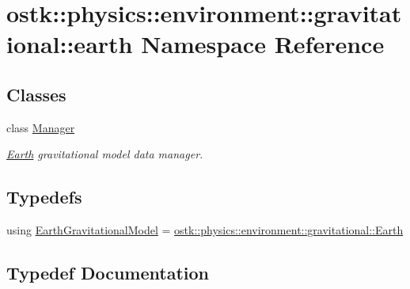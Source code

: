 \hypertarget{namespaceostk_1_1physics_1_1environment_1_1gravitational_1_1earth}{}\section{ostk\+:\+:physics\+:\+:environment\+:\+:gravitational\+:\+:earth Namespace Reference}
\label{namespaceostk_1_1physics_1_1environment_1_1gravitational_1_1earth}
\subsection*{Classes}
\begin{DoxyCompactItemize}
\item 
class \hyperlink{classostk_1_1physics_1_1environment_1_1gravitational_1_1earth_1_1_manager}{Manager}
\begin{DoxyCompactList}\small\item\em \hyperlink{classostk_1_1physics_1_1environment_1_1gravitational_1_1_earth}{Earth} gravitational model data manager. \end{DoxyCompactList}\end{DoxyCompactItemize}
\subsection*{Typedefs}
\begin{DoxyCompactItemize}
\item 
using \hyperlink{namespaceostk_1_1physics_1_1environment_1_1gravitational_1_1earth_a58cd447cbdfb525cde0bf7d94440990f}{Earth\+Gravitational\+Model} = \hyperlink{classostk_1_1physics_1_1environment_1_1gravitational_1_1_earth}{ostk\+::physics\+::environment\+::gravitational\+::\+Earth}
\end{DoxyCompactItemize}


\subsection{Typedef Documentation}
\mbox{\label{namespaceostk_1_1physics_1_1environment_1_1gravitational_1_1earth_a58cd447cbdfb525cde0bf7d94440990f}} 
